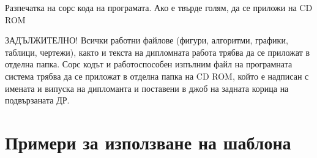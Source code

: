 
Разпечатка на сорс кода на програмата. Ако е твърде голям, да се приложи на CD ROM 

\begin{highlight_title}{ЗАДЪЛЖИТЕЛНО!}
    Всички работни файлове (фигури, алгоритми, графики, таблици, чертежи), както и текста на дипломната работа трябва да се приложат в отделна папка. Сорс кодът и работоспособен изпълним файл на програмната система  трябва да се приложат в отделна папка на CD ROM, който е надписан с имената и випуска на дипломанта и  поставени в джоб на задната корица на подвързаната ДР.
\end{highlight_title}

\chapter{Примери за използване на шаблона}

